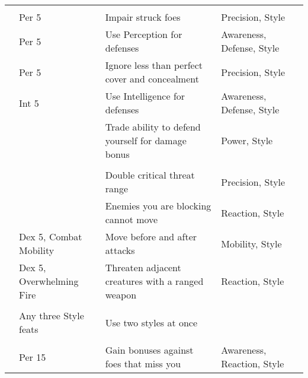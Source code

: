 \begin{longtabuwrapper}
\begin{longtabu}{>{\lcol}p{10em} >{\lcol}p{15em} >{\lcol}X >{\lcol}p{6em} >{\lcol}p{3em}}
        \midrule
         &  &  &  &  \\
         & Per 5 & Impair struck foes & Precision, Style &  \\
         & Per 5 & Use Perception for defenses & Awareness, Defense, Style &  \\
         & Per 5 & Ignore less than perfect cover and concealment & Precision, Style &  \\
         & Int 5 & Use Intelligence for defenses & Awareness, Defense, Style &  \\
         & \x & Trade ability to defend yourself for damage bonus & Power, Style &  \\

        \midrule
         &  &  &  &  \\
         & \x & Double critical threat range & Precision, Style &  \\
         & \x & Enemies you are blocking cannot move & Reaction, Style &  \\
         & Dex 5, Combat Mobility & Move before and after attacks & Mobility, Style &  \\
         & Dex 5, Overwhelming Fire & Threaten adjacent creatures with a ranged weapon & Reaction, Style &  \\

        \midrule
         &  &  &  &  \\
         & Any three Style feats & Use two styles at once & \x &  \\

        \midrule
         &  &  &  &  \\
         & Per 15 & Gain bonuses against foes that miss you & Awareness, Reaction, Style &  \\
    \end{longtabu}
\end{longtabuwrapper}

